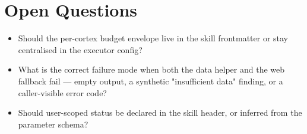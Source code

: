 \section{Open Questions}
\begin{itemize}[leftmargin=1.2em]
  \item Should the per-cortex budget envelope live in the skill frontmatter or stay centralised in the executor config?
  \item What is the correct failure mode when both the data helper and the web fallback fail --- empty output, a synthetic "insufficient data" finding, or a caller-visible error code?
  \item Should user-scoped status be declared in the skill header, or inferred from the parameter schema?
\end{itemize}


